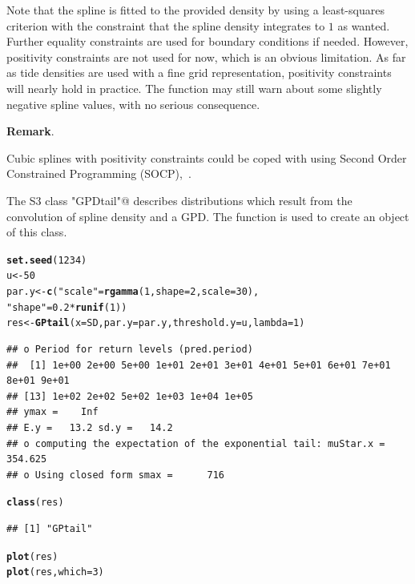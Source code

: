 \documentclass[11pt,a4paper]{report}\usepackage[]{graphicx}\usepackage[]{color}
\makeatletter
\newcommand{\hlnum}[1]{\textcolor[rgb]{0.686,0.059,0.569}{#1}}%
\newcommand{\hlstr}[1]{\textcolor[rgb]{0.192,0.494,0.8}{#1}}%
\newcommand{\hlopt}[1]{\textcolor[rgb]{0,0,0}{#1}}%
\newcommand{\hlstd}[1]{\textcolor[rgb]{0.345,0.345,0.345}{#1}}%
\newcommand{\hlkwb}[1]{\textcolor[rgb]{0.69,0.353,0.396}{#1}}%
\newcommand{\hlkwc}[1]{\textcolor[rgb]{0.333,0.667,0.333}{#1}}%
\newcommand{\hlkwd}[1]{\textcolor[rgb]{0.737,0.353,0.396}{\textbf{#1}}}%
\newenvironment{kframe}{%
 \def\at@end@of@kframe{}%
 \ifinner\ifhmode%
  \def\at@end@of@kframe{\end{minipage}}%
  \begin{minipage}{\columnwidth}%
 \fi\fi%
 \def\FrameCommand##1{\hskip\@totalleftmargin \hskip-\fboxsep
 \colorbox{shadecolor}{##1}\hskip-\fboxsep
     \hskip-\linewidth \hskip-\@totalleftmargin \hskip\columnwidth}%
 \MakeFramed {\advance\hsize-\width
   \@totalleftmargin\z@ \linewidth\hsize
   \@setminipage}}%
 {\par\unskip\endMakeFramed%
 \at@end@of@kframe}
\newenvironment{knitrout}{}{} %
\newenvironment{remark}
   {\medskip \par \noindent%
    \small\textbf{Remark}.%
   }%
   {\par \noindent}
\makeatother
\begin{document}
Note that the spline is fitted to the provided density by using a
least-squares criterion with the constraint that the spline density
integrates to $1$ as wanted.  Further equality constraints are used
for boundary conditions if needed. However, positivity constraints are
not used for now, which is an obvious limitation. As far as tide
densities are used with a fine grid representation, positivity
constraints will nearly hold in practice. The function
\verb@SplineDensity@ may still warn about some slightly negative
spline values, with no serious consequence.


\begin{remark}
  Cubic splines with positivity constraints could be coped with using
  Second Order Constrained Programming (SOCP),~\cite{PappAlizadeh}.
\end{remark}

The S3 class \verb@"GPDtail"@ describes distributions which result
from the convolution of spline density and a GPD. The \verb@GPDtail@
function is used to create an object of this class.

\begin{knitrout}
\color{fgcolor}\begin{kframe}
\begin{alltt}
\hlkwd{set.seed}\hlstd{(}\hlnum{1234}\hlstd{)}
\hlstd{u} \hlkwb{<-} \hlnum{50}
\hlstd{par.y} \hlkwb{<-} \hlkwd{c}\hlstd{(}\hlstr{"scale"} \hlstd{=} \hlkwd{rgamma}\hlstd{(}\hlnum{1}\hlstd{,} \hlkwc{shape} \hlstd{=} \hlnum{2}\hlstd{,} \hlkwc{scale} \hlstd{=} \hlnum{30}\hlstd{),}
           \hlstr{"shape"} \hlstd{=} \hlnum{0.2} \hlopt{*} \hlkwd{runif}\hlstd{(}\hlnum{1}\hlstd{))}
\hlstd{res} \hlkwb{<-} \hlkwd{GPtail}\hlstd{(}\hlkwc{x} \hlstd{= SD,} \hlkwc{par.y} \hlstd{= par.y,} \hlkwc{threshold.y} \hlstd{= u,} \hlkwc{lambda} \hlstd{=} \hlnum{1}\hlstd{)}
\end{alltt}
\begin{verbatim}
## o Period for return levels (pred.period)
##  [1] 1e+00 2e+00 5e+00 1e+01 2e+01 3e+01 4e+01 5e+01 6e+01 7e+01 8e+01 9e+01
## [13] 1e+02 2e+02 5e+02 1e+03 1e+04 1e+05
## ymax =    Inf
## E.y =   13.2 sd.y =   14.2
## o computing the expectation of the exponential tail: muStar.x = 354.625
## o Using closed form smax =      716
\end{verbatim}
\begin{alltt}
\hlkwd{class}\hlstd{(res)}
\end{alltt}
\begin{verbatim}
## [1] "GPtail"
\end{verbatim}
\begin{alltt}
\hlkwd{plot}\hlstd{(res)}
\hlkwd{plot}\hlstd{(res,} \hlkwc{which} \hlstd{=} \hlnum{3}\hlstd{)}
\end{alltt}
\end{kframe}
\end{knitrout}
\end{document}
